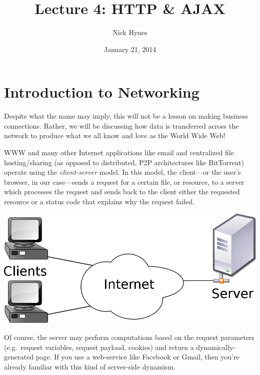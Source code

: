 \documentclass[12pt]{article}
\begin{document}
\title{Lecture 4: HTTP \& AJAX}
\author{Nick Hynes}
\date{January 21, 2014}

\maketitle

\begin{spacing}{0}
\setcounter{tocdepth}{1}
\tableofcontents
\end{spacing}

\section{Introduction to Networking}
Despite what the name may imply, this will not be a lesson on making business connections. Rather, we will be discussing how data is transferred across the network to produce what we all know and love as the World Wide Web!
\par
WWW and many other Internet applications like email and centralized file hosting/sharing (as opposed to distributed, P2P architectures like BitTorrent) operate using the \emph{client-server} model. In this model, the client---or the user's browser, in our case---sends a request for a certain file, or resource, to a server which processes the request and sends back to the client either the requested resource or a status code that explains why the request failed.
\begin{center}
\includegraphics[scale=.25]{images/client-server.png}
\end{center}
\par
Of course, the server may perform computations based on the request parameters (e.g.\ request variables, request payload, cookies) and return a dynamically-generated page. If you use a web-service like Facebook or Gmail, then you're already familiar with this kind of server-side dynamism.
\end{document}
